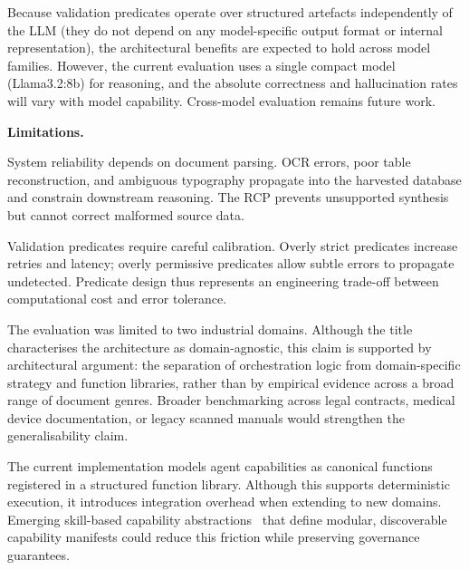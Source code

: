 \documentclass[largeformat]{interact}
\begin{document}
Because validation predicates operate over structured artefacts independently of the LLM (they do not depend on any model-specific output format or internal representation), the architectural benefits are expected to hold across model families. However, the current evaluation uses a single compact model (Llama3.2:8b) for reasoning, and the absolute correctness and hallucination rates will vary with model capability. Cross-model evaluation remains future work.

\vspace{1.0em}
\noindent \textbf{Limitations.}
 
\begin{description}[style=unboxed, leftmargin=0pt, labelindent=0pt, font=\itshape]
 
\item[Upstream extraction quality.]
System reliability depends on document parsing. OCR errors, poor table reconstruction, and ambiguous typography propagate into the harvested database and constrain downstream reasoning. The RCP prevents unsupported synthesis but cannot correct malformed source data.
 
\item[Predicate tuning.]
Validation predicates require careful calibration. Overly strict predicates increase retries and latency; overly permissive predicates allow subtle errors to propagate undetected. Predicate design thus represents an engineering trade-off between computational cost and error tolerance.
 
\item[Domain scope.]
The evaluation was limited to two industrial domains. Although the title characterises the architecture as domain-agnostic, this claim is supported by architectural argument: the separation of orchestration logic from domain-specific strategy and function libraries, rather than by empirical evidence across a broad range of document genres. Broader benchmarking across legal contracts, medical device documentation, or legacy scanned manuals would strengthen the generalisability claim.
 
\item[Extensibility overhead.]
The current implementation models agent capabilities as canonical functions registered in a structured function library. Although this supports deterministic execution, it introduces integration overhead when extending to new domains. Emerging skill-based capability abstractions~\cite{agentskills2024} that define modular, discoverable capability manifests could reduce this friction while preserving governance guarantees.
 

\end{description}
\end{document}

